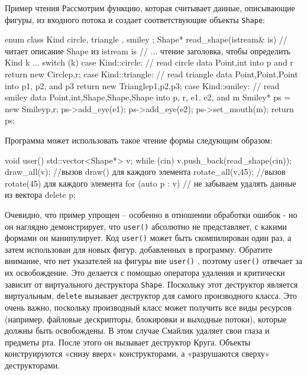 \documentclass[
    8pt,
    hyperref={pdfencoding=unicode}
    ]{beamer}
\theoremstyle{definition}
\begin{document}
\begin{frame}{Пример чтения}
    Рассмотрим функцию, которая считывает данные, описывающие фигуры, из входного потока и создает соответствующие объекты \texttt{Shape}:
    {\small \begin{cppcode}
        enum class Kind { circle, triangle , smiley };
        Shape* read_shape(istream& is) // читает описание Shape из istream is
        {
            // ... чтение заголовка, чтобы определить Kind k ...
            switch (k) {
                case Kind::circle:
                // read circle data {Point,int} into p and r
                return new Circle{p,r};
                case Kind::triangle:
                // read triangle data {Point,Point,Point} into p1, p2, and p3
                return new Triangle{p1,p2,p3};
                case Kind::smiley:
                // read smiley data {Point,int,Shape,Shape,Shape} into p, r, e1, e2, and m
                Smiley* ps = new Smiley{p,r};
                ps->add_eye(e1);
                ps->add_eye(e2);
                ps->set_mouth(m);
                return ps;
            }
        }
    \end{cppcode}
    }

    \newpage
    \small
    Программа может использовать такое чтение формы следующим образом:
    \begin{cppcode}
        void user()
        {
            std::vector<Shape*> v;
            while (cin)
            v.push_back(read_shape(cin));
            draw_all(v); //вызов draw() для каждого элемента
            rotate_all(v,45); //вызов rotate(45) для каждого элемента
            for (auto p : v) // не забываем удалять данные из вектора
                delete p;
        }
    \end{cppcode}
    Очевидно, что пример упрощен -- особенно в отношении обработки ошибок - но он наглядно демонстрирует, что \texttt{user()}  
    абсолютно не представляет, с какими формами он манипулирует. Код \texttt{user()} может быть скомпилирован один раз, а затем 
    использован для новых фигур, добавленных в программу. Обратите внимание, что нет указателей на фигуры вне \texttt{user()} , 
    поэтому \texttt{user()} отвечает за их освобождение. Это делается с помощью оператора удаления и критически зависит от 
    виртуального деструктора \texttt{Shape}. Поскольку этот деструктор является виртуальным, \texttt{delete} вызывает 
    деструктор для самого производного класса. Это очень важно, поскольку производный класс может получить все виды ресурсов (например, 
    файловые дескрипторы, блокировки и выходные потоки), которые должны быть освобождены. В этом случае Смайлик удаляет свои глаза и 
    предметы рта. После этого он вызывает деструктор Круга. Объекты конструируются «снизу вверх» конструкторами, а 
    «разрушаются сверху» деструкторами.
\end{frame}
\end{document}
